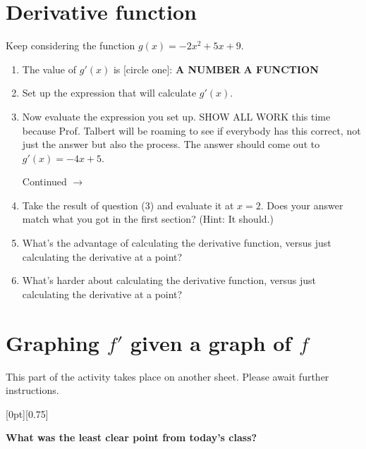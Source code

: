 \documentclass[11pt]{article}
\newcommand{\cuthere}{%
\noindent
\raisebox{-2.8pt}[0pt][0.75\baselineskip]{\small\ding{34}}
\unskip{\tiny\dotfill}
}
\def\ra{\rightarrow}
\def\pageturn{\vfill 
\begin{flushright}
	\begin{small}
		Continued $\ra$
	\end{small}
\end{flushright} \newpage}
\begin{document}
\vspace{3in}



\section{Derivative function}
Keep considering the function $g(x) = -2x^2 + 5x + 9$. 

\begin{enumerate}
	\item The value of $g'(x)$ is [circle one]: \textbf{A NUMBER} \quad \textbf{A FUNCTION} 
	\item Set up the expression that will calculate $g'(x)$. 
	
	\vspace{1in}
	
	\item Now evaluate the expression you set up. SHOW ALL WORK this time because Prof. Talbert will be roaming to see if everybody has this correct, not just the answer but also the process. The answer should come out to $g'(x) = -4x +5$. 
	
	\pageturn
	
	\item Take the result of question (3) and evaluate it at $x = 2$. Does your answer match what you got in the first section? (Hint: It should.) 
	
	\vspace{0.5in}
	
	\item What's the advantage of calculating the derivative function, versus just calculating the derivative at a point? 
	\vspace{0.5in}
	
	\item What's harder about calculating  the derivative function, versus just calculating the derivative at a point? 
	
	\vspace{0.5in}
	
\end{enumerate}

\section{Graphing $f'$ given a graph of $f$} 
This part of the activity takes place on another sheet. Please await further instructions. 


\vfill

\cuthere

\noindent
\textbf{What was the least clear point from today's class?}

\vspace{1in}
\end{document}
